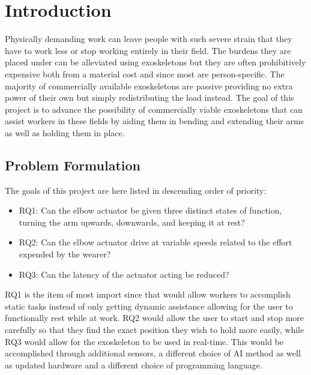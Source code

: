 \section{Introduction}
\label{section:intro}

Physically demanding work can leave people with such severe strain that they have to work less or stop working entirely in 
their field\cite{WorkDemands}. The burdens they are placed under can be alleviated using exoskeletons but they are often 
prohibitively expensive both from a material cost and since most are person-specific. The majority of commercially available 
exoskeletons are passive providing no extra power of their own but simply redistributing the load instead. The goal of this 
project is to advance the possibility of commercially viable exoskeletons that can assist workers in these fields by aiding 
them in bending and extending their arms as well as holding them in place.

\subsection{Problem Formulation}
The goals of this project are here listed in descending order of priority:
\begin{itemize}
        
    \item RQ1: Can the elbow actuator be given three distinct states of function, turning the arm upwards, downwards, and keeping it at rest?

    \item RQ2: Can the elbow actuator drive at variable speeds related to the effort expended by the wearer?

    \item RQ3: Can the latency of the actuator acting be reduced?

\end{itemize}
RQ1 is the item of most import since that would allow workers to accomplish static tasks instead of only getting dynamic assistance 
allowing for the user to functionally rest while at work. RQ2 would allow the user to start and stop more carefully so that they 
find the exact position they wish to hold more easily, while RQ3 would allow for the exoskeleton to be used in real-time.
This would be accomplished through additional sensors, a different choice of AI method as well as updated hardware and a different 
choice of programming language.



